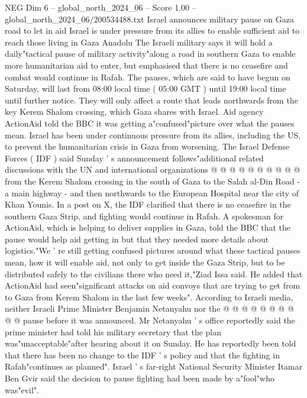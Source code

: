 \begin{textsample}{NEG Dim 6 – global\_north\_2024\_06 – Score 1.00 – global\_north\_2024\_06/200534488.txt}  \label{ex:f6_neg_315}
Israel announces military pause on Gaza road to let in aid Israel is under pressure from its allies to enable sufficient aid to reach those living in Gaza Anadolu The Israeli military says it will hold a daily"tactical pause of military activity"along a road in southern Gaza to enable more humanitarian aid to enter, but emphasised that there is no ceasefire and combat would continue in Rafah.
The pauses, which are said to have begun on Saturday, will last from 08:00 local time ( 05:00 GMT ) until 19:00 local time until further notice.
They will only affect a route that leads northwards from the key Kerem Shalom crossing, which Gaza shares with Israel.
Aid agency ActionAid told the BBC it was getting a"confused"picture over what the pauses mean.
Israel has been under continuous pressure from its allies, including the US, to prevent the humanitarian crisis in Gaza from worsening.
The Israel Defense Forces ( IDF ) said Sunday ' s announcement follows"additional related discussions with the UN and international organizations @ @ @ @ @ @ @ @ @ @ from the Kerem Shalom crossing in the south of Gaza to the Salah al-Din Road - a main highway - and then northwards to the European Hospital near the city of Khan Younis.
In a post on X, the IDF clarified that there is no ceasefire in the southern Gaza Strip, and fighting would continue in Rafah.
A spokesman for ActionAid, which is helping to deliver supplies in Gaza, told the BBC that the pause would help aid getting in but that they needed more details about logistics."We ' re still getting confused pictures around what these tactical pauses mean, how it will enable aid, not only to get inside the Gaza Strip, but to be distributed safely to the civilians there who need it,"Ziad Issa said.
He added that ActionAid had seen"significant attacks on aid convoys that are trying to get from to Gaza from Kerem Shalom in the last few weeks".
According to Israeli media, neither Israeli Prime Minister Benjamin Netanyahu nor the @ @ @ @ @ @ @ @ @ @ pause before it was announced.
Mr Netanyahu ' s office reportedly said the prime minister had told his military secretary that the plan was"unacceptable"after hearing about it on Sunday.
He has reportedly been told that there has been no change to the IDF ' s policy and that the fighting in Rafah"continues as planned".
Israel ' s far-right National Security Minister Itamar Ben Gvir said the decision to pause fighting had been made by a"fool"who was"evil".

\end{textsample}
